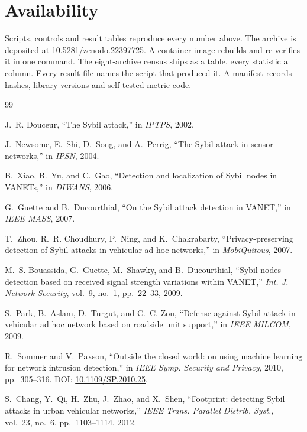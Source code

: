 \documentclass[journal,twoside]{IEEEtran}
\begin{document}
\section*{Availability}

Scripts, controls and result tables reproduce every number above.
The archive is deposited at \url{10.5281/zenodo.22397725}.
A container image rebuilds and re-verifies it in one command.
The eight-archive census ships as a table, every statistic a column.
Every result file names the script that produced it.
A manifest records hashes, library versions and self-tested metric code.

\begin{thebibliography}{99}

 J.~R. Douceur, ``The Sybil attack,'' in \emph{IPTPS}, 2002.

 J.~Newsome, E.~Shi, D.~Song, and A.~Perrig, ``The Sybil attack in sensor networks,'' in \emph{IPSN}, 2004.

 B.~Xiao, B.~Yu, and C.~Gao, ``Detection and localization of Sybil nodes in VANETs,'' in \emph{DIWANS}, 2006.

 G.~Guette and B.~Ducourthial, ``On the Sybil attack detection in VANET,'' in \emph{IEEE MASS}, 2007.

 T.~Zhou, R.~R. Choudhury, P.~Ning, and K.~Chakrabarty, ``Privacy-preserving detection of Sybil attacks in vehicular ad hoc networks,'' in \emph{MobiQuitous}, 2007.

 M.~S. Bouassida, G.~Guette, M.~Shawky, and B.~Ducourthial, ``Sybil nodes detection based on received signal strength variations within VANET,'' \emph{Int. J. Network Security}, vol.~9, no.~1, pp.~22--33, 2009.

 S.~Park, B.~Aslam, D.~Turgut, and C.~C. Zou, ``Defense against Sybil attack in vehicular ad hoc network based on roadside unit support,'' in \emph{IEEE MILCOM}, 2009.

 R.~Sommer and V.~Paxson, ``Outside the closed world: on using machine learning for network intrusion detection,'' in \emph{IEEE Symp. Security and Privacy}, 2010, pp.~305--316. DOI: \url{10.1109/SP.2010.25}.

 S.~Chang, Y.~Qi, H.~Zhu, J.~Zhao, and X.~Shen, ``Footprint: detecting Sybil attacks in urban vehicular networks,'' \emph{IEEE Trans. Parallel Distrib. Syst.}, vol.~23, no.~6, pp.~1103--1114, 2012.


\end{thebibliography}
\end{document}
